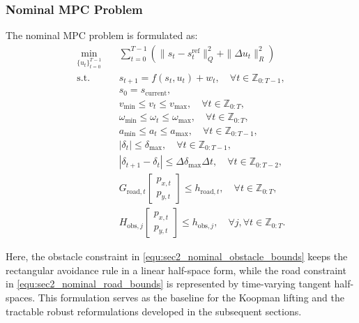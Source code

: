 \documentclass[pdflatex,sn-mathphys,Numbered]{sn-jnl}
\numberwithin{equation}{section}
\begin{document}
	\subsubsection{Nominal MPC Problem}
	The nominal MPC problem is formulated as:
	\begin{subequations}\label{equ:sec2_nominal_mpc}
	\begin{align}
		\min_{\{u_t\}_{t=0}^{T-1}} \quad & \sum_{t=0}^{T-1} \left( \| s_t - s_t^{\text{ref}} \|_Q^2 + \|\Delta u_t\|_R^2 \right) \nonumber \\
		\text{s.t.} \quad & s_{t+1} = f(s_t, u_t) + w_t, \quad \forall t \in \mathbb{Z}_{0:T-1}, \label{equ:sec2_nominal_dynamics} \\
		& s_0 = s_{\text{current}}, \label{equ:sec2_initial_condition} \\
		& v_{\min} \le v_t \le v_{\max}, \quad \forall t \in \mathbb{Z}_{0:T}, \label{equ:sec2_nominal_velocity_limits} \\
		& \omega_{\min} \le \omega_t \le \omega_{\max}, \quad \forall t \in \mathbb{Z}_{0:T}, \label{equ:sec2_nominal_yaw_rate_limits} \\
		& a_{\min} \le a_t \le a_{\max}, \quad \forall t \in \mathbb{Z}_{0:T-1}, \label{equ:sec2_nominal_acceleration_limits} \\
		& |\delta_t| \le \delta_{\max}, \quad \forall t \in \mathbb{Z}_{0:T-1}, \label{equ:sec2_nominal_steering_limits} \\
		& |\delta_{t+1} - \delta_t| \le \Delta\delta_{\max} \Delta t, \quad \forall t \in \mathbb{Z}_{0:T-2}, \label{equ:sec2_nominal_steering_rate_limit} \\
		& G_{\text{road},t} \begin{bmatrix} p_{x,t} \\ p_{y,t} \end{bmatrix} \le h_{\text{road},t}, \quad \forall t \in \mathbb{Z}_{0:T}, \label{equ:sec2_nominal_road_bounds} \\
		& H_{\text{obs},j} \begin{bmatrix} p_{x,t} \\ p_{y,t} \end{bmatrix} \le h_{\text{obs},j}, \quad \forall j, \forall t \in \mathbb{Z}_{0:T}. \label{equ:sec2_nominal_obstacle_bounds}
	\end{align}
	\end{subequations}
	
	Here, the obstacle constraint in \eqref{equ:sec2_nominal_obstacle_bounds} keeps the rectangular avoidance rule in a linear half-space form, while the road constraint in \eqref{equ:sec2_nominal_road_bounds} is represented by time-varying tangent half-spaces. This formulation serves as the baseline for the Koopman lifting and the tractable robust reformulations developed in the subsequent sections.
	
\end{document}

